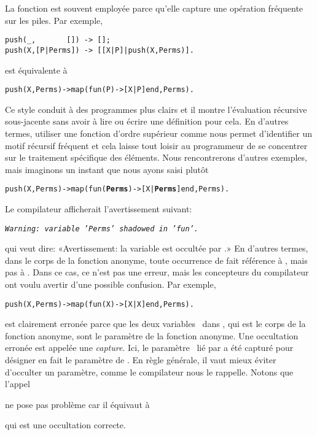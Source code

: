 La fonction  est souvent employée parce qu'elle capture
une opération fréquente sur les piles. Par exemple,
\begin{verbatim}
push(_,       []) -> [];
push(X,[P|Perms]) -> [[X|P]|push(X,Perms)].
\end{verbatim}
est équivalente à
\begin{alltt}
push(X,Perms) -> map(fun(P) -> [X|P] end,Perms).
\end{alltt}
Ce style conduit à des programmes plus clairs et il montre
l'évaluation récursive sous-jacente sans avoir à lire ou écrire une
définition pour cela. En d'autres termes, utiliser une fonction
d'ordre supérieur comme  nous permet d'identifier un
motif récursif fréquent et cela laisse tout loisir au programmeur de
se concentrer sur le traitement spécifique des éléments. Nous
rencontrerons d'autres exemples, mais imaginons un instant que nous
ayons saisi plutôt
\begin{alltt}
push(X,Perms) -> map(fun(\textbf{Perms}) -> [X|\textbf{Perms}] end,Perms).
\end{alltt}
Le compilateur \Erlang afficherait l'avertissement suivant:
\begin{center}
\emph{\texttt{Warning: variable 'Perms' shadowed in
    'fun'.}}\label{shadowing}
\end{center}
qui veut dire: «Avertissement: la variable  est
occultée par .» En d'autres termes, dans le corps de la
fonction anonyme, toute occurrence de  fait référence à
, mais pas à . Dans ce cas,
ce n'est pas une erreur, mais les concepteurs du compilateur ont voulu
avertir d'une possible confusion. Par exemple,
\begin{alltt}
push(X,Perms) -> map(fun(X) -> [X|X] end,Perms).\hfill% \emph{Capture}
\end{alltt}
est clairement erronée parce que les deux variables~ dans
\erlcode{[X|X]}, qui est le corps de la fonction anonyme, sont le
paramètre de la fonction anonyme. Une occultation erronée est appelée
une \emph{capture}. Ici, le paramètre~ lié par
 a été capturé pour désigner en fait le
paramètre de . En règle générale, il vaut mieux éviter
d'occulter un paramètre, comme le compilateur \Erlang nous le
rappelle. Notons que l'appel
\begin{center}
\end{center}
ne pose pas problème car il équivaut à
\begin{center}
\end{center}
qui est une occultation correcte.

